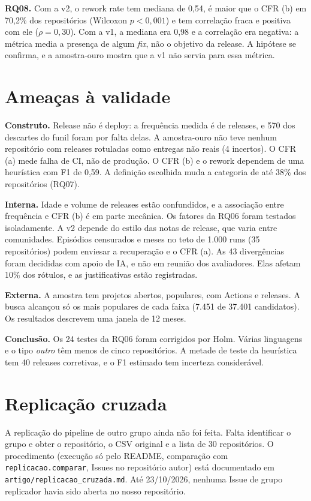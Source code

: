 \documentclass[12pt]{article}
\begin{document}
\textbf{RQ08.} Com a v2, o rework rate tem mediana de 0,54, é maior que o
CFR (b) em 70,2\% dos repositórios (Wilcoxon $p<0{,}001$) e tem correlação
fraca e positiva com ele ($\rho=0{,}30$). Com a v1, a mediana era 0,98 e a
correlação era negativa: a métrica media a presença de algum \emph{fix}, não
o objetivo da release. A hipótese se confirma, e a amostra-ouro mostra que a
v1 não servia para essa métrica.

\section{Ameaças à validade}

\textbf{Construto.} Release não é deploy: a frequência medida é de releases,
e 570 dos descartes do funil foram por falta delas. A amostra-ouro não teve
nenhum repositório com releases rotuladas como entregas não reais (4
incertos). O CFR (a) mede falha de CI, não de produção. O CFR (b) e o rework
dependem de uma heurística com F1 de 0,59. A definição escolhida muda a
categoria de até 38\% dos repositórios (RQ07).

\textbf{Interna.} Idade e volume de releases estão confundidos, e a
associação entre frequência e CFR (b) é em parte mecânica. Os fatores da RQ06
foram testados isoladamente. A v2 depende do estilo das notas de release, que
varia entre comunidades. Episódios censurados e meses no teto de 1.000 runs
(35 repositórios) podem enviesar a recuperação e o CFR (a). As 43
divergências foram decididas com apoio de IA, e não em reunião dos
avaliadores. Elas afetam 10\% dos rótulos, e as justificativas estão
registradas.

\textbf{Externa.} A amostra tem projetos abertos, populares, com Actions e
releases. A busca alcançou só os mais populares de cada faixa (7.451 de 37.401
candidatos). Os resultados descrevem uma janela de 12 meses.

\textbf{Conclusão.} Os 24 testes da RQ06 foram corrigidos por Holm. Várias
linguagens e o tipo \emph{outro} têm menos de cinco repositórios. A metade de
teste da heurística tem 40 releases corretivas, e o F1 estimado tem
incerteza considerável.

\section{Replicação cruzada}

A replicação do pipeline de outro grupo ainda não foi feita. Falta
identificar o grupo e obter o repositório, o CSV original e a lista de 30
repositórios. O procedimento (execução só pelo README, comparação com
\texttt{replicacao.comparar}, Issues no repositório autor) está documentado
em \texttt{artigo/replicacao\_cruzada.md}. Até 23/10/2026, nenhuma Issue de
grupo replicador havia sido aberta no nosso repositório.
\end{document}
